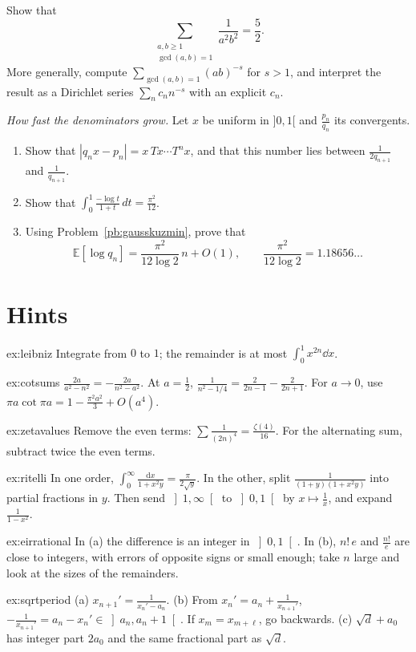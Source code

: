 \begin{exercise}[$\star\star$]\label{pb:coprime52}
Show that
\[
\sum_{\substack{a,b\ge1\\\gcd(a,b)=1}}\frac1{a^2b^2}=\frac52.
\]
More generally, compute $\sum_{\gcd(a,b)=1}(ab)^{-s}$ for $s>1$, and interpret the result as a Dirichlet series
$\sum_nc_nn^{-s}$ with an explicit $c_n$.
\end{exercise}

\begin{exercise}[$\star\star$]\label{pb:levy}
\emph{How fast the denominators grow.} Let $x$ be uniform in $]0,1[$ and $\frac{p_n}{q_n}$ its convergents.
\begin{enumerate}[label=(\alph*)]
\item Show that $|q_nx-p_n|=x\,Tx\cdots T^nx$, and that this number lies between $\frac1{2q_{n+1}}$ and $\frac1{q_{n+1}}$.
\item Show that $\int_0^1\frac{-\log t}{1+t}\,dt=\frac{\pi^2}{12}$.
\item Using Problem~\ref{pb:gausskuzmin}, prove that
\[
\mathbb E[\log q_n]=\frac{\pi^2}{12\log2}\,n+O(1),\qquad\frac{\pi^2}{12\log2}=1.18656\ldots
\]
\end{enumerate}
\end{exercise}

\section{Hints}

\begin{hint}{ex:leibniz}
Integrate from $0$ to $1$; the remainder is at most $\int_0^1x^{2n}\dd x$.
\end{hint}
\begin{hint}{ex:cotsums}
$\frac{2a}{a^2-n^2}=-\frac{2a}{n^2-a^2}$. At $a=\frac12$, $\frac1{n^2-1/4}=\frac2{2n-1}-\frac2{2n+1}$. For $a\to0$, use
$\pi a\cot\pi a=1-\frac{\pi^2a^2}3+O(a^4)$.
\end{hint}
\begin{hint}{ex:zetavalues}
Remove the even terms: $\sum\frac1{(2n)^4}=\frac{\zeta(4)}{16}$. For the alternating sum, subtract twice the even terms.
\end{hint}
\begin{hint}{ex:ritelli}
In one order, $\int_0^\infty\frac{\mathrm dx}{1+x^2y}=\frac\pi{2\sqrt y}$. In the other, split
$\frac1{(1+y)(1+x^2y)}$ into partial fractions in $y$. Then send $\left]1,\infty\right[$ to $\left]0,1\right[$ by $x\mapsto\frac1x$, and expand
$\frac1{1-x^2}$.
\end{hint}
\begin{hint}{ex:eirrational}
In (a) the difference is an integer in $\left]0,1\right[$. In (b), $n!\,e$ and $\frac{n!}e$ are close to integers, with errors of
opposite signs or small enough; take $n$ large and look at the sizes of the remainders.
\end{hint}
\begin{hint}{ex:sqrtperiod}
(a) $x_{n+1}'=\frac1{x_n'-a_n}$. (b) From $x_n'=a_n+\frac1{x_{n+1}'}$, $-\frac1{x_{n+1}'}=a_n-x_n'\in\left]a_n,a_n+1\right[$. If
$x_m=x_{m+\ell}$, go backwards. (c) $\sqrt d+a_0$ has integer part $2a_0$ and the same fractional part as $\sqrt d$.
\end{hint}

